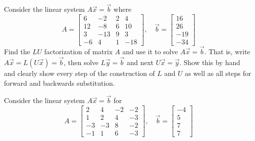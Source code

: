 \documentclass[addpoints, 11pt]{exam}
\begin{document}
\begin{questions}


\question Consider the linear system $A\vec{x}=\vec{b}$ where
$$
A= \left[
\begin{array}{cccc}
6 & -2 & 2 & 4 \\
12 & -8 & 6 & 10 \\
3 & -13 & 9 & 3 \\
-6 & 4 & 1 & -18
\end{array} \right], \quad
\vec{b} = \left[
\begin{array}{c}
16 \\
26 \\
-19 \\
-34
\end{array} \right]
$$
Find the $LU$ factorization of matrix $A$ and use it to solve $A\vec{x}=\vec{b}$. That is, write \\ $A\vec{x}=L(U\vec{x})=\vec{b}$, then solve $L\vec{y}=\vec{b}$ and next $U\vec{x}=\vec{y}$. Show this by hand and clearly show every step of the construction of $L$ and $U$ as well as all steps for forward and backwards substitution. 

\question Consider the linear system $A\vec{x}=\vec{b}$ for 
$$
A= \left[
\begin{array}{cccc}
2 & 4 & -2 & -2 \\
1 & 2 & 4 & -3 \\
-3 & -3 & 8 & -2 \\
-1 & 1 & 6 & -3
\end{array} \right], \quad
\vec{b} = \left[
\begin{array}{c}
-4 \\
5 \\
7 \\
7
\end{array} \right]
$$
\end{questions}
\end{document}
